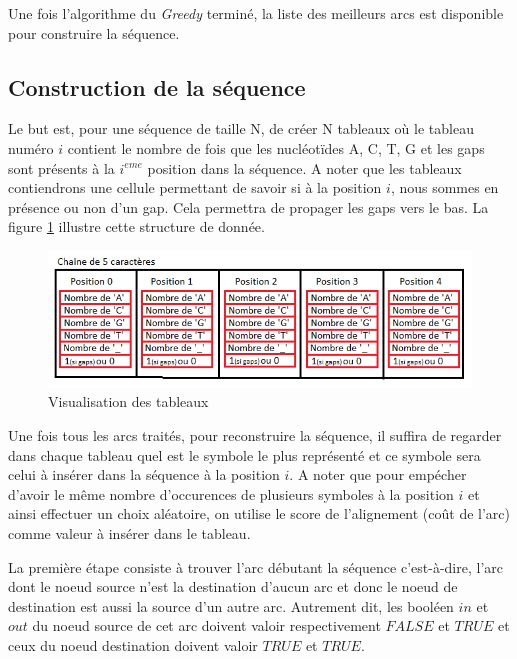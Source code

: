 \documentclass[12pt,a4paper,final]{article}
\begin{document}
Une fois l'algorithme du \textit{Greedy} terminé, la liste des meilleurs arcs est disponible pour construire la séquence.

\subsection{Construction de la séquence}

Le but est, pour une séquence de taille N, de créer N tableaux où le tableau numéro $i$ contient le nombre de fois que les nucléotïdes A, C, T, G et les gaps sont présents à la $i^{eme}$ position dans la séquence. A noter que les tableaux contiendrons une cellule permettant de savoir si à la position $i$, nous sommes en présence ou non d'un gap.  Cela permettra de propager les gaps vers le bas. La figure \ref{table} illustre cette structure de donnée.\medskip

\begin{figure}[!ht]
\centering
	\includegraphics[width=1\textwidth]{images/table.png}
	\caption{\label{table}Visualisation des tableaux}
\end{figure}

Une fois tous les arcs traités, pour reconstruire la séquence, il suffira de regarder dans chaque tableau quel est le symbole le plus représenté et ce symbole sera celui à insérer dans la séquence à la position $i$.  A noter que pour empécher d'avoir le même nombre d'occurences de plusieurs symboles à la position $i$ et ainsi effectuer un choix aléatoire, on utilise le score de l'alignement (coût de l'arc) comme valeur à insérer dans le tableau.\medskip

La première étape consiste à trouver l'arc débutant la séquence c'est-à-dire, l'arc dont le noeud source n'est la destination d'aucun arc et donc le noeud de destination est aussi la source d'un autre arc.%
Autrement dit, les booléen $in$ et $out$ du noeud source de cet arc doivent valoir respectivement $FALSE$ et $TRUE$  et ceux du noeud destination doivent valoir $TRUE$ et $TRUE$.\medskip
\end{document}
